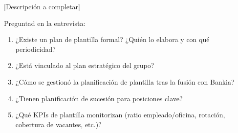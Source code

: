 
[Descripción a completar]

\begin{notaequipo}
  Preguntad en la entrevista:
  \begin{enumerate}
    \item ¿Existe un plan de plantilla formal? ¿Quién lo elabora y con qué periodicidad?
    \item ¿Está vinculado al plan estratégico del grupo?
    \item ¿Cómo se gestionó la planificación de plantilla tras la fusión con Bankia?
    \item ¿Tienen planificación de sucesión para posiciones clave?
    \item ¿Qué KPIs de plantilla monitorizan (ratio empleado/oficina, rotación,
          cobertura de vacantes, etc.)?
  \end{enumerate}
\end{notaequipo}
